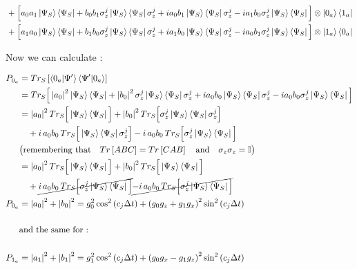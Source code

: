 \documentclass[a4paper,12pt]{article}
\begin{document}
\begin{align}
	   	& + \Big[ a_{0} a_{1} \ket{\Psi_{S}}\bra{\Psi_{S}} + b_{0} b_{1}  \sigma_{z}^{j}\ket{\Psi_{S}}\bra{\Psi_{S}}\sigma_{z}^{j} + i a_{0}b_{1}\ket{\Psi_{S}}\bra{\Psi_{S}}\sigma_{z}^{j} -  i a_{1}b_{0} \sigma_{z}^{j} \ket{\Psi_{S}}\bra{\Psi_{S}} \Big] \otimes \ket{0_{a}} \bra{1_{a}} \notag \\
	   	& + \Big[ a_{1} a_{0} \ket{\Psi_{S}}\bra{\Psi_{S}} + b_{1} b_{0}  \sigma_{z}^{j}\ket{\Psi_{S}}\bra{\Psi_{S}}\sigma_{z}^{j} + i a_{1}b_{0}\ket{\Psi_{S}}\bra{\Psi_{S}}\sigma_{z}^{j} -  i a_{0}b_{1} \sigma_{z}^{j} \ket{\Psi_{S}}\bra{\Psi_{S}} \Big] \otimes \ket{1_{a}} \bra{0_{a}}
	   \end{align}
			
	   Now we can calculate :
		
	   \begin{align}
		P_{0_{a}} & = Tr_{S} \left[\braket{0_a|\Psi'}\braket{\Psi'|0_a} 	\right] \notag \\
		& = Tr_{S} \Big[ \left|a_{0}\right|^{2} 	\ket{\Psi_{S}}\bra{\Psi_{S}} + \left|b_{0}\right|^{2} \sigma_{z}^{j} \ket{\Psi_{S}}\bra{\Psi_{S}} \sigma_{z}^{j} + i a_{0}b_{0}\ket{\Psi_{S}}\bra{\Psi_{S}} \sigma_{z}^{j} -  i a_{0}b_{0} \sigma_{z}^{j} \ket{\Psi_{S}}\bra{\Psi_{S}} \Big] \notag \\
		& = \left|a_{0}\right|^{2} Tr_{S} \Big[ 	\ket{\Psi_{S}}\bra{\Psi_{S}} \Big] + \left|b_{0}\right|^{2} Tr_{S} \Big[ \sigma_{z}^{j} \ket{\Psi_{S}}\bra{\Psi_{S}} \sigma_{z}^{j} \Big] \notag \\
		& \quad + i \,a_{0} b_{0} \, Tr_{S} \Big[ 	\ket{\Psi_{S}}\bra{\Psi_{S}} \sigma_{z}^{j} \Big] - i \, a_{0} b_{0} \, Tr_{S} \Big[ \sigma_{z}^{j} \ket{\Psi_{S}}\bra{\Psi_{S}} \Big] \notag \\
		& \big(\text{remembering that} \quad Tr \left[ABC\right] = Tr 	\left[CAB\right] \quad \text{and} \quad \sigma_{z} \sigma_{z} = \mathbb{I} \big) \notag \\
		& = \left|a_{0}\right|^{2} Tr_{S} \Big[ 	\ket{\Psi_{S}}\bra{\Psi_{S}} \Big] + \left|b_{0}\right|^{2} Tr_{S} \Big[  \ket{\Psi_{S}}\bra{\Psi_{S}} \Big] \notag \\
		& \quad + \cancel{i \,a_{0} b_{0} \, Tr_{S} \Big[ \sigma_{z}^{j} 	\ket{\Psi_{S}}\bra{\Psi_{S}} \Big]} \cancel{- i \, a_{0} b_{0} \, Tr_{S} \Big[ \sigma_{z}^{j} \ket{\Psi_{S}}\bra{\Psi_{S}} \Big]} \notag \\
		P_{0_{a}} & = \left|a_{0}\right|^{2} + \left|b_{0}\right|^{2} = 	g_{0}^{2} \cos^{2}{\left(c_{j}\Delta t\right)} + \left(g_{0} g_{z} + g_{1}g_{x} \right)^{2} \sin^{2}{\left(c_{j}\Delta t\right)} \\
		\notag \\
	    & \text{and the same for :} \notag \\
	    \notag \\
	  	P_{1_{a}} &= \left|a_{1}\right|^{2} + \left|b_{1}\right|^{2} = 	g_{1}^{2} \cos^{2}{\left(c_{j}\Delta t\right)} + \left(g_{0} g_{x} - g_{1}g_{z} \right)^{2} \sin^{2}{\left(c_{j}\Delta t\right)}
	   \end{align}
	  
\end{document}
